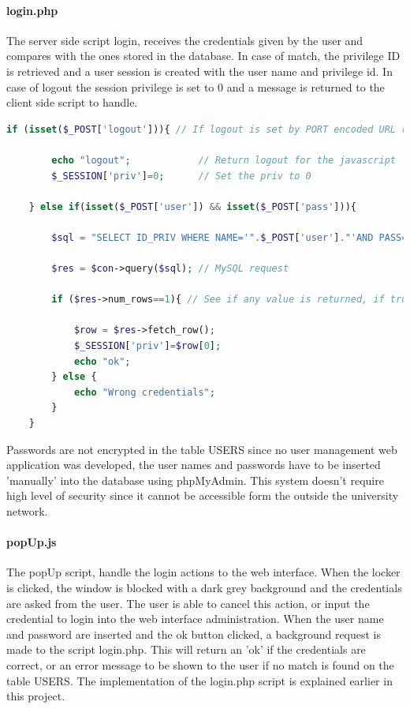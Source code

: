 \paragraph{login.php }The server side script login, receives the credentials given by the user and compares with the ones stored in the database. In case of match, the privilege ID is retrieved and a user session is created with the user name and privilege id. In case of logout the session privilege is set to 0 and a message is returned to the client side script to handle.
\begin{lstlisting}[language=php]
	if (isset($_POST['logout'])){ // If logout is set by PORT encoded URL request
		
		echo "logout";			  // Return logout for the javascript
		$_SESSION['priv']=0;	  // Set the priv to 0
		
	} else if(isset($_POST['user']) && isset($_POST['pass'])){
		
		$sql = "SELECT ID_PRIV WHERE NAME='".$_POST['user']."'AND PASS='".$_POST['pass']."'"; // SQL statment contruction (No encryption in password)
		
		$res = $con->query($sql); // MySQL request

		if ($res->num_rows==1){ // See if any value is returned, if true assign privelege to session priv.
			
			$row = $res->fetch_row();	
			$_SESSION['priv']=$row[0];
			echo "ok";
		} else {
			echo "Wrong credentials";
		}
	}
\end{lstlisting}

Passwords are not encrypted in the table USERS since no user management web application was developed, the user names and passwords have to be inserted 'manually' into the database using phpMyAdmin. This system doesn't require high level of security since it cannot be accessible form the outside the university network.

\paragraph{popUp.js}
The popUp script, handle the login actions to the web interface. When the locker is clicked, the window is blocked with a dark grey background and the credentials are asked from the user. The user is able to cancel this action, or input the credential to login into the web interface administration. When the user name and password are inserted and the ok button clicked, a background request is made to the script login.php. This will return an 'ok' if the credentials are correct, or an error message to be shown to the user if no match is found on the table USERS. The implementation of the login.php script is explained earlier in this project.

